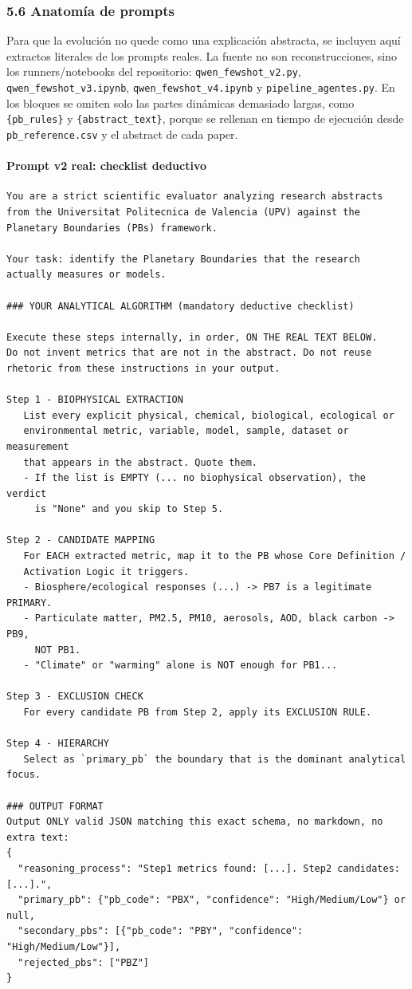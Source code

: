 \subsubsection{5.6 Anatomía de prompts}

Para que la evolución no quede como una explicación abstracta, se incluyen aquí extractos literales de los prompts reales. La fuente no son reconstrucciones, sino los runners/notebooks del repositorio: \texttt{qwen\_fewshot\_v2.py}, \texttt{qwen\_fewshot\_v3.ipynb}, \texttt{qwen\_fewshot\_v4.ipynb} y \texttt{pipeline\_agentes.py}. En los bloques se omiten solo las partes dinámicas demasiado largas, como \texttt{\{pb\_rules\}} y \texttt{\{abstract\_text\}}, porque se rellenan en tiempo de ejecución desde \texttt{pb\_reference.csv} y el abstract de cada paper.

\paragraph{Prompt v2 real: checklist deductivo}

{\footnotesize
\begin{verbatim}
You are a strict scientific evaluator analyzing research abstracts
from the Universitat Politecnica de Valencia (UPV) against the
Planetary Boundaries (PBs) framework.

Your task: identify the Planetary Boundaries that the research
actually measures or models.

### YOUR ANALYTICAL ALGORITHM (mandatory deductive checklist)

Execute these steps internally, in order, ON THE REAL TEXT BELOW.
Do not invent metrics that are not in the abstract. Do not reuse
rhetoric from these instructions in your output.

Step 1 - BIOPHYSICAL EXTRACTION
   List every explicit physical, chemical, biological, ecological or
   environmental metric, variable, model, sample, dataset or measurement
   that appears in the abstract. Quote them.
   - If the list is EMPTY (... no biophysical observation), the verdict
     is "None" and you skip to Step 5.

Step 2 - CANDIDATE MAPPING
   For EACH extracted metric, map it to the PB whose Core Definition /
   Activation Logic it triggers.
   - Biosphere/ecological responses (...) -> PB7 is a legitimate PRIMARY.
   - Particulate matter, PM2.5, PM10, aerosols, AOD, black carbon -> PB9,
     NOT PB1.
   - "Climate" or "warming" alone is NOT enough for PB1...

Step 3 - EXCLUSION CHECK
   For every candidate PB from Step 2, apply its EXCLUSION RULE.

Step 4 - HIERARCHY
   Select as `primary_pb` the boundary that is the dominant analytical focus.

### OUTPUT FORMAT
Output ONLY valid JSON matching this exact schema, no markdown, no extra text:
{
  "reasoning_process": "Step1 metrics found: [...]. Step2 candidates: [...].",
  "primary_pb": {"pb_code": "PBX", "confidence": "High/Medium/Low"} or null,
  "secondary_pbs": [{"pb_code": "PBY", "confidence": "High/Medium/Low"}],
  "rejected_pbs": ["PBZ"]
}
\end{verbatim}
}

